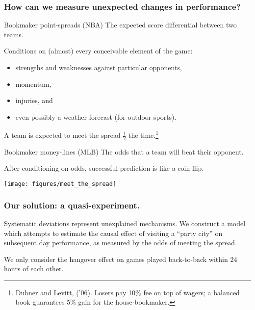 \documentclass{beamer}
\begin{document}
\begin{frame}
  \frametitle{How can we measure unexpected changes in performance?}     
  \begin{block}{Bookmaker point-spreads (NBA)}     
    The expected score differential between two teams.

    Conditions on (almost) every conceivable element of the game:
    \begin{itemize}     
      \item strengths and weaknesses against particular opponents,
      \item momentum,
      \item injuries, and
      \item even possibly a weather forecast (for outdoor sports).     
    \end{itemize}

    A team is expected to meet the spread $\frac{1}{2}$ the time.\footnote{Dubner and Levitt, ('06). Losers pay 10\% fee on top of wagers; a balanced book guarantees 5\% gain for the house-bookmaker.}
  \end{block}
  \vspace{12pt}
  \begin{block}{Bookmaker money-lines (MLB)}     
    The odds that a team will beat their opponent.

    After conditioning on odds, successful prediction is like a coin-flip. 
  \end{block} 
\end{frame}

\begin{frame}
  \centering   \texttt{[image: figures/meet\_the\_spread]} 
\end{frame}


\begin{frame}   \frametitle{Our solution: a quasi-experiment.}
  \begin{block}{Systematic deviations represent unexplained mechanisms.}     We construct a model which attempts to estimate the causal effect of visiting a ``party city''
    on subsequent day performance, as measured by the odds of meeting the spread.       \end{block}

  \begin{block}{}     We only consider the hangover effect on games played back-to-back within 24 hours of each other.   
  \end{block} 
\end{frame}
\end{document}
